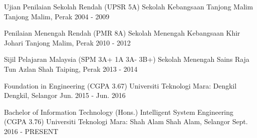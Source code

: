 

\begin{cventries}


\cventry
  {Ujian Penilaian Sekolah Rendah (UPSR 5A)}
  {Sekolah Kebangsaan Tanjong Malim}
  {Tanjong Malim, Perak}
  {2004 - 2009}
  {}

\cventry
  {Penilaian Menengah Rendah (PMR 8A)}
  {Sekolah Menengah Kebangsaan Khir Johari}
  {Tanjong Malim, Perak}
  {2010 - 2012}
  {}
  
 \cventry
  {Sijil Pelajaran Malaysia (SPM 3A+ 1A 3A- 3B+)}
  {Sekolah Menengah Sains Raja Tun Azlan Shah}
  {Taiping, Perak}
  {2013 - 2014}
  {}

\cventry
  {Foundation in Engineering (CGPA 3.67)}
  {Universiti Teknologi Mara: Dengkil}
  {Dengkil, Selangor}
  {Jun. 2015 - Jun. 2016}
  {}

  \cventry
  {Bachelor of Information Technology (Hons.) Intelligent System Engineering (CGPA 3.76)}
  {Universiti Teknologi Mara: Shah Alam}
  {Shah Alam, Selangor}
  {Sept. 2016 - PRESENT}
  {}

\end{cventries}
